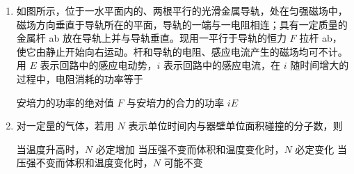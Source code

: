 \documentclass[\gkver]{gaokaozhenti}
\begin{document}
\begin{enumerate}
{当用频率为 $2\nu_{0}$ 的单色光照射该金属时，所产生的光电子的最大初动能为 $h\nu_{0}$}
{当照射光的频率 $\nu$ 大于 $\nu_{0}$ 时，若 $\nu$ 增大，则逸出功增大}
{当照射光的频率 $\nu$ 大于 $\nu_{0}$ 时，若 $\nu$ 增大一倍，则光电子的最大初动能也增大一倍}


\item
如图所示，位于一水平面内的、两根平行的光滑金属导轨，处在匀强磁场中，磁场方向垂直于导轨所在的平面，导轨的一端与一电阻相连；具有一定质量的金属杆 ab 放在导轨上并与导轨垂直。现用一平行于导轨的恒力 $F$ 拉杆 ab，使它由静止开始向右运动。杆和导轨的电阻、感应电流产生的磁场均可不计。用 $E$ 表示回路中的感应电动势，$i$ 表示回路中的感应电流，在 $i$ 随时间增大的过程中，电阻消耗的功率等于

\onepicture[w=4.76cm]{}

{安培力的功率的绝对值}
{$F$ 与安培力的合力的功率}
{$iE$}


\item
对一定量的气体，若用 $N$ 表示单位时间内与器壁单位面积碰撞的分子数，则

{当温度升高时，$N$ 必定增加}
{当压强不变而体积和温度变化时，$N$ 必定变化}
{当压强不变而体积和温度变化时，$N$ 可能不变}


\end{enumerate}
\end{document}
